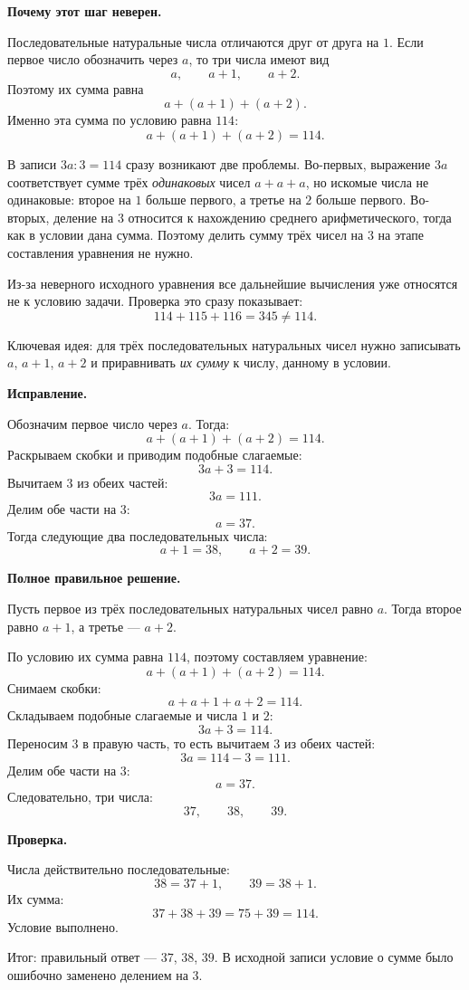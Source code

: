 \documentclass[12pt,a4paper]{article}
\begin{document}
\textbf{Почему этот шаг неверен.}

Последовательные натуральные числа отличаются друг от друга на $1$. Если первое число обозначить через $a$, то три числа имеют вид
\[
a,
\qquad
a+1,
\qquad
a+2.
\]
Поэтому их сумма равна
\[
a+(a+1)+(a+2).
\]
Именно эта сумма по условию равна $114$:
\[
a+(a+1)+(a+2)=114.
\]

В записи $3a:3=114$ сразу возникают две проблемы. Во-первых, выражение $3a$ соответствует сумме трёх \emph{одинаковых} чисел $a+a+a$, но искомые числа не одинаковые: второе на $1$ больше первого, а третье на $2$ больше первого. Во-вторых, деление на $3$ относится к нахождению среднего арифметического, тогда как в условии дана сумма. Поэтому делить сумму трёх чисел на $3$ на этапе составления уравнения не нужно.

Из-за неверного исходного уравнения все дальнейшие вычисления уже относятся не к условию задачи. Проверка это сразу показывает:
\[
114+115+116=345\neq114.
\]

\textcolor{blue!60!black}{Ключевая идея:} для трёх последовательных натуральных чисел нужно записывать $a$, $a+1$, $a+2$ и приравнивать \emph{их сумму} к числу, данному в условии.

\textbf{Исправление.}

Обозначим первое число через $a$. Тогда:
\[
a+(a+1)+(a+2)=114.
\]
Раскрываем скобки и приводим подобные слагаемые:
\[
3a+3=114.
\]
Вычитаем $3$ из обеих частей:
\[
3a=111.
\]
Делим обе части на $3$:
\[
a=37.
\]
Тогда следующие два последовательных числа:
\[
a+1=38,
\qquad
a+2=39.
\]

\textbf{Полное правильное решение.}

Пусть первое из трёх последовательных натуральных чисел равно $a$. Тогда второе равно $a+1$, а третье --- $a+2$.

По условию их сумма равна $114$, поэтому составляем уравнение:
\[
a+(a+1)+(a+2)=114.
\]
Снимаем скобки:
\[
a+a+1+a+2=114.
\]
Складываем подобные слагаемые и числа $1$ и $2$:
\[
3a+3=114.
\]
Переносим $3$ в правую часть, то есть вычитаем $3$ из обеих частей:
\[
3a=114-3=111.
\]
Делим обе части на $3$:
\[
a=37.
\]
Следовательно, три числа:
\[
37,
\qquad
38,
\qquad
39.
\]

\textbf{Проверка.}

Числа действительно последовательные:
\[
38=37+1,
\qquad
39=38+1.
\]
Их сумма:
\[
37+38+39=75+39=114.
\]
Условие выполнено.

\textcolor{teal!60!black}{Итог:} правильный ответ --- $37$, $38$, $39$. В исходной записи условие о сумме было ошибочно заменено делением на $3$.
\end{document}
